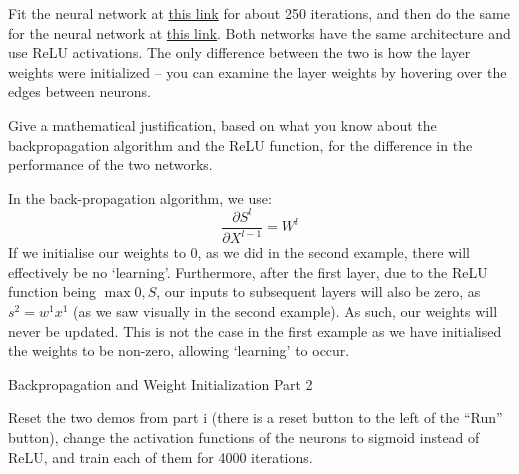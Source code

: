Fit the neural network at \href{http://playground.tensorflow.org/#activation=relu&batchSize=10&dataset=circle&regDataset=reg-plane&learningRate=0.03&regularizationRate=0&noise=0&networkShape=4,2&seed=0.65409&showTestData=false&discretize=false&percTrainData=50&x=true&y=true&xTimesY=false&xSquared=false&ySquared=false&cosX=false&sinX=false&cosY=false&sinY=false&collectStats=false&problem=classification&initZero=false&hideText=false}{this link} for about 250 iterations, and then do the same for the neural network at  \href{http://playground.tensorflow.org//\#activation=relu&batchSize=10&dataset=circle&regDataset=reg-plane&learningRate=0.03&regularizationRate=0&noise=0&networkShape=4,2&seed=0.6&showTestData=false&discretize=false&percTrainData=50&x=true&y=true&xTimesY=false&xSquared=false&ySquared=false&cosX=false&sinX=false&cosY=false&sinY=false&collectStats=false&problem=classification&initZero=true&hideText=false}{this link}.  Both networks have the same architecture and use ReLU activations.  The only difference between the two is how the layer weights were initialized -- you can examine the layer weights by hovering over the edges between neurons.

Give a mathematical justification, based on what you know about the backpropagation algorithm and the ReLU function, for the difference in the performance of the two networks.

\begin{subsolution}
 In the back-propagation algorithm, we use:
 \begin{equation}
   \frac{\partial S^l}{\partial X^{l-1}}=W^l
 \end{equation}
 If we initialise our weights to 0, as we did in the second example, there will effectively be no `learning'. Furthermore, after the first layer, due to the ReLU function being $\max{0,S}$, our inputs to subsequent layers will also be zero, as $s^2=w^1x^1$ (as we saw visually in the second example). As such, our weights will never be updated. This is not the case in the first example as we have initialised the weights to be non-zero, allowing `learning' to occur. 
\end{subsolution}

\begin{problem}[5]
  Backpropagation and Weight Initialization Part 2
\end{problem}
Reset the two demos from part i (there is a reset button to the left of the ``Run'' button), change the activation functions of the neurons to sigmoid instead of ReLU, and train each of them for 4000 iterations.

